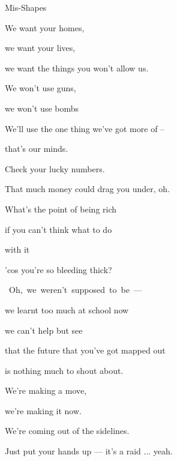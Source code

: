 \begin{song}{Mis-Shapes}{

    \chordset[Verse]{ \AMaj \EMaj \Fshm \DMaj \DSeven}

    \chordset[Chorus]{ \GMaj \GMajSeven \GSeven \CMaj \CMajSeven \CSeven }
	
	\chordset{ \Em \EmSix \EmaddC }

}
\begin{songchorus}
		We want your homes,

		we want your lives,

		we want the things you won't allow us. 

		We won't use guns, 

		we won't use bombs

		We'll use the one thing we've got more of --

		that's our minds.  \hspace{30pt}  \hspace{20pt} 

	\end{songchorus}

	\begin{songverse}

		 Check your lucky numbers.

		That much money could drag you under, oh. 

		What's the point of being rich 

		if you can't think what to do 
		
		with it 

		'cos you're so bleeding thick?

	\end{songverse}

	\begin{songverse}

		
		\mbox{ Oh, we weren't supposed to be ---} 

		we learnt too much at school now 

		 we can't help but see 

		that the future that you've got mapped out 

		is  nothing much to shout about. 

	\end{songverse}

	\begin{songchorus}

		
		 \quad We're making a move, 

		we're making it now. 

		We're coming out of the sidelines. 

		\quad Just put your hands up --- it's a raid ... yeah.


\end{songchorus}
\end{song}
